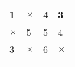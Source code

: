 \begin{tabular}{|l|l|l|l|}
\hline
1 & $\times$  & 4 & 3 \\ \hline
 $\times$ & 5 & 5 & 4 \\ \hline
3 & $\times$  & 6 & $\times$  \\ \hline
  &   &   &   \\ \hline
\end{tabular}
